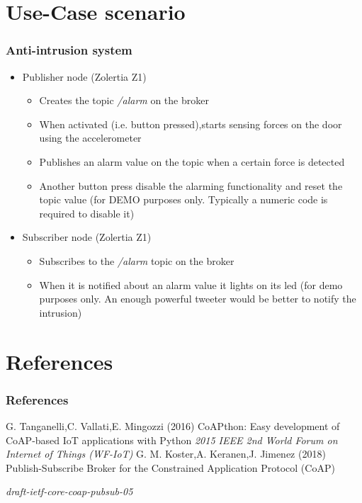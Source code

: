 \documentclass{beamer}
\begin{document}
\section{Use-Case scenario}
\begin{frame}
\frametitle{Anti-intrusion system} 
\begin{itemize}
  \item Publisher node (Zolertia Z1)\pause
  \begin{itemize}
    \item Creates the topic \textit{/alarm} on the broker\pause
    \item When activated (i.e. button pressed),starts sensing forces on the door using the accelerometer\pause
    \item Publishes an alarm value on the topic when a certain force is detected\pause
    \item Another button press disable the alarming functionality and reset the topic value (for DEMO purposes only. Typically a numeric code is required to disable it)
  \end{itemize}\pause

  \item Subscriber node (Zolertia Z1)\pause
  \begin{itemize}
    \item Subscribes to the \textit{/alarm} topic on the broker\pause
    \item When it is notified about an alarm value it lights on its led (for demo purposes only. An enough powerful tweeter would be better to notify the intrusion)
  \end{itemize}
\end{itemize}
\end{frame}


\section{References}
\begin{frame}
\frametitle{References}
\footnotesize{
\begin{thebibliography}{99} %
G. Tanganelli,C. Vallati,E. Mingozzi (2016)
\newblock CoAPthon: Easy development of CoAP-based IoT applications with Python
\newblock \emph{2015 IEEE 2nd World Forum on Internet of Things (WF-IoT)}
G. M. Koster,A. Keranen,J. Jimenez (2018)
\newblock Publish-Subscribe Broker for the Constrained Application Protocol (CoAP)

\newblock \emph{draft-ietf-core-coap-pubsub-05}
\end{thebibliography}
}
\end{frame}
\end{document}
